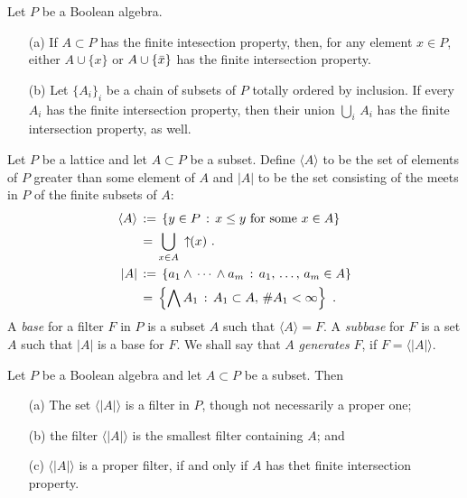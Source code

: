 \begin{lemmaFIP}\label{thm:fip}
	Let $P$ be a Boolean algebra.
	\begin{itemize}
		\item[(a)] If $A\subset P$ has the finite intesection
			property, then, for any element $x\in P$, either
			$A\cup\{x\}$ or $A\cup\{\bar{x}\}$ has the finite
			intersection property.
		\item[(b)] Let $\{A_{i}\}_{i}$ be a chain of subsets
			of $P$ totally ordered by inclusion. If every $A_{i}$
			has the finite intersection property, then their
			union $\bigcup_{i}\,A_{i}$ has the finite intersection
			property, as well.
	\end{itemize}
\end{lemmaFIP}

Let $P$ be a lattice and let $A\subset P$ be a subset. Define
$\langle A\rangle$ to be the set of elements of $P$ greater than some
element of $A$ and $|A|$ to be the set consisting of the meets in $P$
of the finite subsets of $A$:
\begin{align*}
	\langle A\rangle & \,:=\,\left\lbrace y\in P\,:\, x\leq y
				\text{ for some } x\in A\right\rbrace \\
		& \,=\,\bigcup_{x\in A}\,\uparrow\!\!(x) \text{ .} \\
	|A| & \,:=\,\left\lbrace a_{1}\wedge\,\cdots\,\wedge a_{m}\,:\,
			a_{1},\,\dots,\,a_{m}\in A\right\rbrace \\
		& \,=\,\left\lbrace \bigwedge A_{1}\,:\,
				A_{1}\subset A,\,\# A_{1}<\infty\right\rbrace
	\text{ .}
\end{align*}
%
A \emph{base} for a filter $F$ in $P$ is a subset $A$ such that
$\langle A\rangle = F$. A \emph{subbase} for $F$ is a set $A$ such that
$|A|$ is a base for $F$. We shall say that $A$ \emph{generates} $F$,
if $F=\langle |A|\rangle$.

\begin{lemmaFilterGeneratedBySubset}\label{thm:filtergeneratedbysubset}
	Let $P$ be a Boolean algebra and let $A\subset P$ be a subset.
	Then
	\begin{itemize}
		\item[(a)] The set $\langle |A|\rangle$ is a filter in $P$,
			though not necessarily a proper one;
		\item[(b)] the filter $\langle |A|\rangle$ is the smallest
			filter containing $A$; and
		\item[(c)] $\langle |A|\rangle$ is a proper filter, if and
			only if $A$ has thet finite intersection property.
	\end{itemize}
\end{lemmaFilterGeneratedBySubset}

